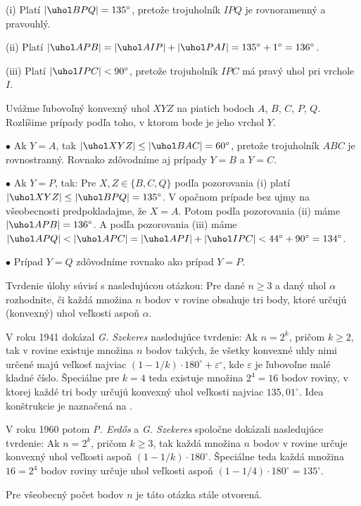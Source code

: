 {\smallskip
\item{(i)} Platí $|\uhol BPQ|=135^\circ$, pretože trojuholník $IPQ$ je rovnoramenný a pravouhlý.
\item{(ii)} Platí $|\uhol APB|=|\uhol AIP|+|\uhol PAI|=135^\circ+1^\circ=136^\circ$.
\item{(iii)} Platí $|\uhol IPC|<90^\circ$, pretože trojuholník $IPC$ má pravý uhol pri vrchole $I$.

\smallskip\noindent
Uvážme ľubovoľný konvexný uhol $XYZ$ na piatich bodoch $A$, $B$, $C$, $P$, $Q$. Rozlíšime prípady podľa toho, v ktorom bode je jeho vrchol $Y$.

\smallskip
\item{$\bullet$} Ak $Y=A$, tak $|\uhol XYZ|\le |\uhol BAC|=60^\circ $, pretože trojuholník $ABC$ je rovnostranný. Rovnako zdôvodníme aj prípady $Y=B$ a $Y=C$.
\item{$\bullet$} Ak $Y=P$, tak:
\itemitem{$\scriptstyle\bullet$} Pre $X,Z\in\{B,C,Q\}$ podľa pozorovania (i) platí $|\uhol XYZ|\le |\uhol BPQ|=135^\circ$.
\itemitem{$\scriptstyle\bullet$} V opačnom prípade bez ujmy na všeobecnosti predpokladajme, že $X=A$. Potom podľa pozorovania (ii) máme $|\uhol APB|=136^\circ$. A podľa pozorovania (iii) máme $|\uhol APQ|<|\uhol APC|=|\uhol API|+|\uhol IPC| < 44^\circ + 90^\circ = 134^\circ$.
\item{$\bullet$} Prípad $Y=Q$ zdôvodníme rovnako ako prípad $Y=P$.


\poznamka
Tvrdenie úlohy súvisí s nasledujúcou otázkou: Pre dané $n\ge 3$ a daný uhol $\alpha$ rozhodnite, či každá množina $n$ bodov v rovine obsahuje tri body, ktoré určujú (konvexný) uhol veľkosti aspoň $\alpha$.

V roku 1941 dokázal \emph{G. Szekeres} nasledujúce tvrdenie: Ak $n=2^k$, pričom $k\ge 2$, tak v rovine existuje množina $n$ bodov takých, že všetky konvexné uhly nimi určené majú veľkosť najviac $(1-1/k)\cdot 180^\circ+\varepsilon^\circ$, kde $\varepsilon$ je ľubovoľne malé kladné číslo.
Špeciálne pre $k=4$ teda existuje množina $2^4=16$ bodov roviny, v ktorej každé tri body určujú konvexný uhol veľkosti najviac $135{,}01^\circ$. Idea konštrukcie je naznačená na \obr{}.
%

V roku 1960 potom \emph{P. Erd\H os} a \emph{G. Szekeres} spoločne dokázali nasledujúce tvrdenie: Ak $n=2^k$, pričom $k\ge3$, tak každá množina $n$ bodov v rovine určuje konvexný uhol veľkosti aspoň $(1-1/k)\cdot 180^\circ$.
Špeciálne teda každá množina $16=2^4$ bodov roviny určuje uhol veľkosti aspoň $(1-1/4)\cdot 180^\circ = 135^\circ$.

Pre všeobecný počet bodov $n$ je táto otázka stále otvorená.
}

